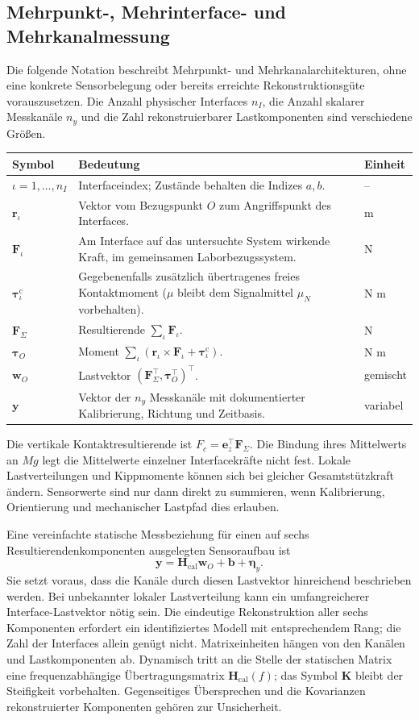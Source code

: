 \documentclass[11pt,a4paper]{article}
\makeatletter
\newenvironment{symtab}{\begin{longtable}{@{}L{.22\textwidth}L{.62\textwidth}L{.12\textwidth}@{}}\toprule\textbf{Symbol}&\textbf{Bedeutung}&\textbf{Einheit}\\\midrule\endhead}{\bottomrule\end{longtable}}
\makeatother
\begin{document}
\subsection{Mehrpunkt-, Mehrinterface- und Mehrkanalmessung}\label{sec:mehrkanal}
Die folgende Notation beschreibt Mehrpunkt- und Mehrkanalarchitekturen, ohne eine konkrete Sensorbelegung oder bereits erreichte Rekonstruktionsgüte vorauszusetzen. Die Anzahl physischer Interfaces $n_I$, die Anzahl skalarer Messkanäle $n_y$ und die Zahl rekonstruierbarer Lastkomponenten sind verschiedene Größen.
\begin{symtab}
$\iota=1,\ldots,n_I$&Interfaceindex; Zustände behalten die Indizes $a,b$.&--\\
$\mathbf r_\iota$&Vektor vom Bezugspunkt $O$ zum Angriffspunkt des Interfaces.&m\\
$\mathbf F_\iota$&Am Interface auf das untersuchte System wirkende Kraft, im gemeinsamen Laborbezugssystem.&N\\
$\boldsymbol\tau^{\mathrm c}_\iota$&Gegebenenfalls zusätzlich übertragenes freies Kontaktmoment ($\mu$ bleibt dem Signalmittel $\mu_N$ vorbehalten).&N m\\
$\mathbf F_\Sigma$&Resultierende $\sum_\iota\mathbf F_\iota$.&N\\
$\boldsymbol\tau_O$&Moment $\sum_\iota(\mathbf r_\iota\times\mathbf F_\iota+\boldsymbol\tau^{\mathrm c}_\iota)$.&N m\\
$\mathbf w_O$&Lastvektor $(\mathbf F_\Sigma^\top,\boldsymbol\tau_O^\top)^\top$.&gemischt\\
$\mathbf y$&Vektor der $n_y$ Messkanäle mit dokumentierter Kalibrierung, Richtung und Zeitbasis.&variabel\\
\end{symtab}
Die vertikale Kontaktresultierende ist $F_c=\mathbf e_z^\top\mathbf F_\Sigma$. Die Bindung ihres Mittelwerts an $Mg$ legt die Mittelwerte einzelner Interfacekräfte nicht fest. Lokale Lastverteilungen und Kippmomente können sich bei gleicher Gesamtstützkraft ändern. Sensorwerte sind nur dann direkt zu summieren, wenn Kalibrierung, Orientierung und mechanischer Lastpfad dies erlauben.

Eine vereinfachte statische Messbeziehung für einen auf sechs Resultierendenkomponenten ausgelegten Sensoraufbau ist
\[
\mathbf y=\mathbf H_{\mathrm{cal}}\mathbf w_O+\mathbf b+\boldsymbol\eta_y.
\]
Sie setzt voraus, dass die Kanäle durch diesen Lastvektor hinreichend beschrieben werden. Bei unbekannter lokaler Lastverteilung kann ein umfangreicherer Interface-Lastvektor nötig sein. Die eindeutige Rekonstruktion aller sechs Komponenten erfordert ein identifiziertes Modell mit entsprechendem Rang; die Zahl der Interfaces allein genügt nicht. Matrixeinheiten hängen von den Kanälen und Lastkomponenten ab. Dynamisch tritt an die Stelle der statischen Matrix eine frequenzabhängige Übertragungsmatrix $\mathbf H_{\mathrm{cal}}(f)$; das Symbol $\mathbf K$ bleibt der Steifigkeit vorbehalten. Gegenseitiges Übersprechen und die Kovarianzen rekonstruierter Komponenten gehören zur Unsicherheit.
\end{document}
